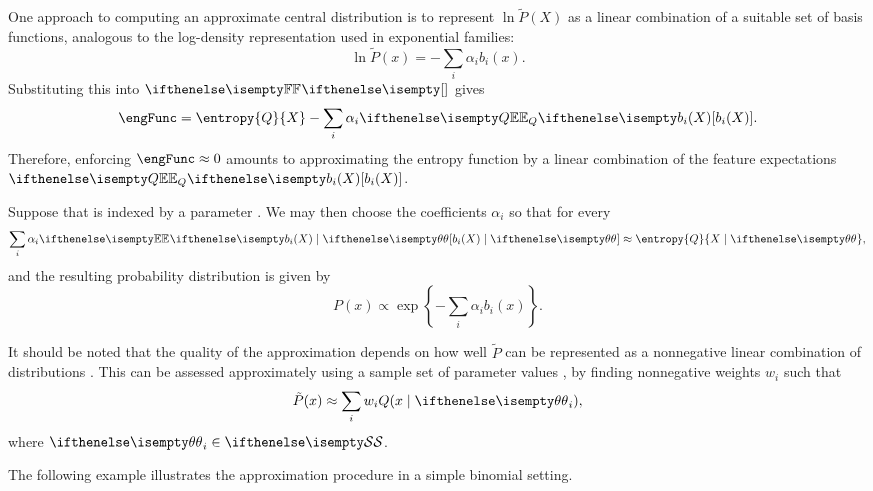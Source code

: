 One approach to computing an approximate central distribution is to represent $\ln \tilde P(X)$ as a linear
combination of a suitable set of basis functions,
analogous to the log-density representation used in exponential families:
\[
    \ln \tilde P(x) = -\sum_i \alpha_i b_i(x).
\]
Substituting this into $\measure{F}{}{}$ gives
\[
    \engFunc = \entropy{Q}{X} - \sum_i \alpha_i \Ex{Q}{b_i(X)}.
\]
Therefore, enforcing $\engFunc \approx 0$ amounts to approximating the entropy function by a linear
combination of the feature expectations $\Ex{Q}{b_i(X)}$.

Suppose that \setQ is indexed by a parameter \param.
We may then choose the coefficients $\alpha_i$ so that for every \paramVal
\[
    \sum_i \alpha_i \Ex{}{b_i(X) \mid \paramVal} \approx \entropy{Q}{X \mid \paramVal},
\]
and the resulting probability distribution is given by
\[
    P(x) \propto \exp \left\{-\sum_i \alpha_i b_i(x) \right\}.
\]

It should be noted that the quality of the approximation depends on how well $\tilde P$ can be represented as a
nonnegative linear combination of distributions .
This can be assessed approximately using a sample set of parameter values , by finding nonnegative weights $w_i$
such that
\[
    \tilde P(x) \approx \sum_i w_i Q(x \mid \paramVal_i),
\]
where $\inSet[\paramVal_i]{S}$.

The following example illustrates the approximation procedure in a simple binomial setting.

\begin{example}
    
\end{example}